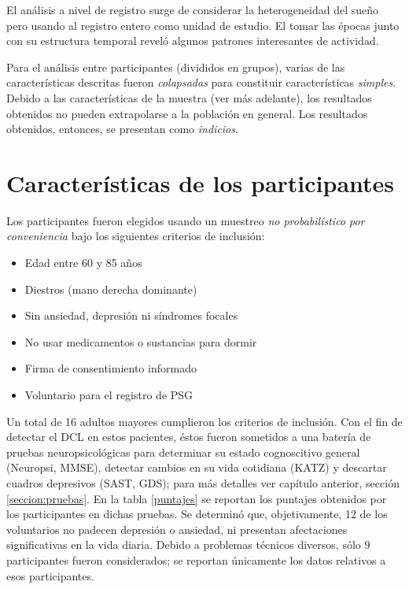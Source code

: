El análisis a nivel de registro surge de considerar la heterogeneidad del sueño pero usando al registro entero como unidad de estudio.
%
%
El tomar las épocas junto con su estructura temporal reveló algunos patrones interesantes de actividad.

Para el análisis entre participantes (divididos en grupos), varias de las características descritas fueron \textit{colapsadas} para constituir características \textit{simples}. 
%
%
Debido a las características de la muestra (ver más adelante), los resultados obtenidos no pueden extrapolarse a la población en general.
%
Los resultados obtenidos, entonces, se presentan como \textit{indicios}.


\section{Características de los participantes}

Los participantes fueron elegidos usando un muestreo \textit{no probabilístico por conveniencia} bajo los siguientes criterios de inclusión:
\begin{itemize}
\item Edad entre 60 y 85 años
\item Diestros (mano derecha dominante)
\item Sin ansiedad, depresión ni síndromes focales
\item No usar medicamentos o sustancias para dormir
\item Firma de consentimiento informado
\item Voluntario para el registro de PSG
\end{itemize}

Un total de 16 adultos mayores cumplieron los criterios de inclusión. 
%
Con el fin de detectar el DCL en estos pacientes, éstos fueron sometidos a una batería de pruebas neuropsicológicas para determinar su estado cognoscitivo general (Neuropsi, MMSE), detectar cambios en su vida cotidiana (KATZ) y descartar cuadros depresivos (SAST, GDS); para más detalles ver capítulo anterior, sección \ref{seccion:pruebas}.
%
%
En la tabla \ref{puntajes} se reportan los puntajes obtenidos por los participantes en dichas pruebas.
%
Se determinó que, objetivamente, 12 de los voluntarios no padecen depresión o ansiedad, ni presentan afectaciones significativas en la vida diaria.
%
Debido a problemas técnicos diversos, sólo 9 participantes fueron considerados; se reportan únicamente los datos relativos a esos participantes.

